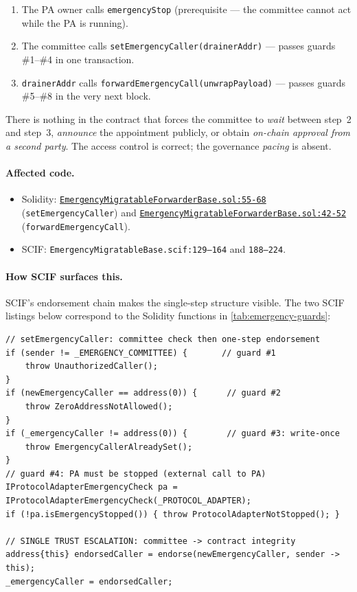 \documentclass[11pt,a4paper]{article}
\newcommand{\fwdRepoRoot}{https://github.com/anoma/anomapay-erc20-forwarder/blob/main/contracts/src}
\newcommand{\fwdrefR}[4]{\href{\fwdRepoRoot/#1#2\#L#3-L#4}{\nolinkurl{#2:#3-#4}}}
\begin{document}
\begin{enumerate}
  \item The PA owner calls \texttt{emergencyStop} (prerequisite --- the
    committee cannot act while the PA is running).
  \item The committee calls \texttt{setEmergencyCaller(drainerAddr)} ---
    passes guards \#1--\#4 in one transaction.
  \item \texttt{drainerAddr} calls
    \texttt{forwardEmergencyCall(unwrapPayload)} --- passes guards
    \#5--\#8 in the very next block.
\end{enumerate}

There is nothing in the contract that forces the committee to \emph{wait}
between step~2 and step~3, \emph{announce} the appointment publicly, or
obtain \emph{on-chain approval from a second party}. The access control
is correct; the governance \emph{pacing} is absent.

\paragraph{Affected code.}
\begin{itemize}
  \item Solidity: \fwdrefR{bases/}{EmergencyMigratableForwarderBase.sol}{55}{68}
    (\texttt{setEmergencyCaller}) and
    \fwdrefR{bases/}{EmergencyMigratableForwarderBase.sol}{42}{52}
    (\texttt{forwardEmergencyCall}).
  \item SCIF: \texttt{EmergencyMigratableBase.scif:129--164} and
    \texttt{188--224}.
\end{itemize}

\paragraph{How SCIF surfaces this.}
SCIF's endorsement chain makes the single-step structure visible.
The two SCIF listings below correspond to the Solidity functions in
\cref{tab:emergency-guards}:

\begin{lstlisting}[style=scifstyle,caption={Emergency governance label chain in \texttt{EmergencyMigratableBase.scif}.}]
// setEmergencyCaller: committee check then one-step endorsement
if (sender != _EMERGENCY_COMMITTEE) {       // guard #1
    throw UnauthorizedCaller();
}
if (newEmergencyCaller == address(0)) {      // guard #2
    throw ZeroAddressNotAllowed();
}
if (_emergencyCaller != address(0)) {        // guard #3: write-once
    throw EmergencyCallerAlreadySet();
}
// guard #4: PA must be stopped (external call to PA)
IProtocolAdapterEmergencyCheck pa = IProtocolAdapterEmergencyCheck(_PROTOCOL_ADAPTER);
if (!pa.isEmergencyStopped()) { throw ProtocolAdapterNotStopped(); }

// SINGLE TRUST ESCALATION: committee -> contract integrity
address{this} endorsedCaller = endorse(newEmergencyCaller, sender -> this);
_emergencyCaller = endorsedCaller;
\end{lstlisting}
\end{document}
